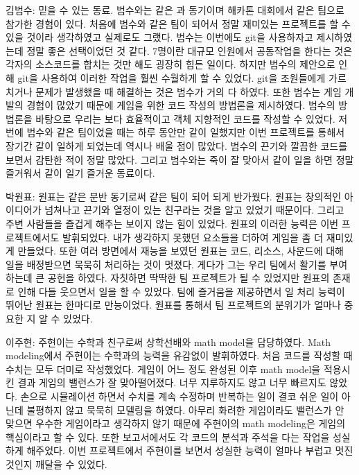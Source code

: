 \documentclass[10pt,oneside,a4paper,titlepage]{article}
\begin{document}
김범수: 믿을 수 있는 동료. 범수와는 같은 과 동기이며 해카톤 대회에서 같은 팀으로 참가한 경험이 있다. 처음에 범수와 같은 팀이 되어서 정말 재미있는 프로젝트를 할 수 있을 것이라 생각하였고 실제로도 그랬다. 범수는 이번에도 git을 사용하자고 제시하였는데 정말 좋은 선택이었던 것 같다. 7명이란 대규모 인원에서 공동작업을 한다는 것은 각자의 소스코드를 합치는 것만 해도 굉장히 힘든 일이다. 하지만 범수의 제안으로 인해 git을 사용하여 이러한 작업을 훨씬 수월하게 할 수 있었다. git을 조원들에게 가르치거나 문제가 발생했을 때 해결하는 것은 범수가 거의 다 하였다. 또한 범수는 게임 개발의 경험이 많았기 때문에 게임을 위한 코드 작성의 방법론을 제시하였다. 범수의 방법론을 바탕으로 우리는 보다 효율적이고 객체 지향적인 코드를 작성할 수 있었다. 저번에 범수와 같은 팀이었을 때는 하루 동안만 같이 일했지만 이번 프로젝트를 통해서 장기간 같이 일하게 되었는데 역시나 배울 점이 많았다. 범수의 끈기와 깔끔한 코드를 보면서 감탄한 적이 정말 많았다. 그리고 범수와는 죽이 잘 맞아서 같이 일을 하면 정말 즐거워서 같이 일기 즐거운 동료이다.

박원표: 원표는 같은 분반 동기로써 같은 팀이 되어 되게 반가웠다. 원표는 창의적인 아이디어가 넘쳐나고 끈기와 열정이 있는 친구라는 것을 알고 있었기 때문이다. 그리고 주변 사람들을 즐겁게 해주는 보이지 않는 힘이 있었다. 원표의 이러한 능력은 이번 프로젝트에서도 발휘되었다. 내가 생각하지 못했던 요소들을 더하여 게임을 좀 더 재미있게 만들었다. 또한 여러 방면에서 재능을 보였던 원표는 코드, 리소스, 사운드에 대해 일을 배정받으면 묵묵히 처리하는 것이 멋졌다. 게다가 그는 우리 팀에서 활기를 부여하는데 큰 공헌을 하였다. 자칫하면 딱딱한 팀 프로젝트가 될 수 있었지만 원표의 존재로 인해 다들 웃으면서 일을 할 수 있었다. 팀에 즐거움을 제공하면서 일 처리 능력이 뛰어난 원표는 한마디로 만능이었다. 원표를 통해서 팀 프로젝트의 분위기가 얼마나 중요한 지 알 수 있었다.

이주현: 주현이는 수학과 친구로써 상학선배와 math model을 담당하였다. Math modeling에서 주현이는 수학과의 능력을 유감없이 발휘하였다. 처음 코드를 작성할 때 수치는 모두 더미로 작성했었다. 게임이 어느 정도 완성된 이후 math model을 적용시킨 결과 게임의 밸런스가 잘 맞아떨어졌다. 너무 지루하지도 않고 너무 빠르지도 않았다. 손으로 시뮬레이션 하면서 수치를 계속 수정하며 반복하는 일이 결코 쉬운 일이 아닌데 불평하지 않고 묵묵히 모델링을 하였다. 아무리 화려한 게임이라도 밸런스가 안 맞으면 우수한 게임이라고 생각하지 않기 때문에 주현이의 math modeling은 게임의 핵심이라고 할 수 있다. 또한 보고서에서도 각 코드의 분석과 주석을 다는 작업을 성실하게 해주었다. 이번 프로젝트에서 주현이를 보면서 성실한 능력이 얼마나 부럽고 멋진 것인지 깨달을 수 있었다.
\end{document}
